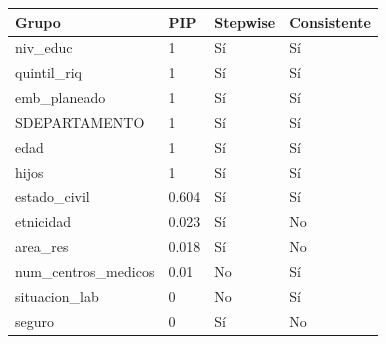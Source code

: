 \begin{tabular}{llll}
  \toprule
Grupo & PIP & Stepwise & Consistente \\ 
  \midrule
niv\_educ & 1 & Sí & Sí \\ 
  quintil\_riq & 1 & Sí & Sí \\ 
  emb\_planeado & 1 & Sí & Sí \\ 
  SDEPARTAMENTO & 1 & Sí & Sí \\ 
  edad & 1 & Sí & Sí \\ 
  hijos & 1 & Sí & Sí \\ 
  estado\_civil & 0.604 & Sí & Sí \\ 
  etnicidad & 0.023 & Sí & No \\ 
  area\_res & 0.018 & Sí & No \\ 
  num\_centros\_medicos & 0.01 & No & Sí \\ 
  situacion\_lab & 0 & No & Sí \\ 
  seguro & 0 & Sí & No \\ 
   \bottomrule
\end{tabular}
